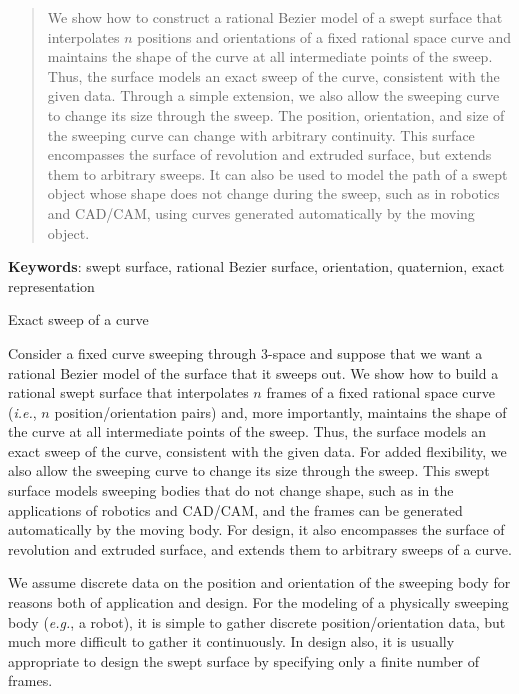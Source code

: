 \maketitle
\thispagestyle{empty}
\begin{abstract}
We show how to construct a rational Bezier model of a swept
surface that interpolates
$n$ positions and orientations of a fixed rational space curve
and maintains the shape of the curve at all intermediate points
of the sweep.
Thus, the surface models
an exact sweep of the curve, consistent with the given data.
Through a simple extension, we also allow the sweeping curve to change
its size through the sweep.
The position, orientation, and size of the sweeping curve can change with
arbitrary continuity.
This surface
encompasses the surface of revolution and extruded surface, but extends
them to arbitrary sweeps.
It can also be used to model the path of a swept object whose shape does not
change during the sweep, such as in robotics and CAD/CAM, using curves generated
automatically by the moving object.
\end{abstract}

{\bf Keywords}: swept surface, rational Bezier surface, orientation, quaternion, exact representation

\clearpage

Exact sweep of a curve

Consider a fixed curve sweeping through 3-space and suppose
that we want a rational Bezier model of the surface that it sweeps out.
We show how to build a rational swept surface that
interpolates $n$ frames of a fixed rational space curve 
({\em i.e.}, $n$ position/orientation pairs) 
and, more importantly, 
maintains the shape of the curve at all intermediate points of the sweep.
Thus, the surface models 
an exact sweep of the curve, consistent with the given data.
For added flexibility, we also allow the sweeping curve to change its
size through the sweep.
This swept surface models sweeping bodies that do not change shape,
such as in the applications of robotics and CAD/CAM,
and the frames can be generated automatically by the moving body.
For design, it also encompasses the surface of revolution 
and extruded surface, and extends them to arbitrary sweeps of a curve.

We assume discrete data on the position and orientation
of the sweeping body for reasons both of application and design.
For the modeling of a physically sweeping body ({\em e.g.}, a robot), 
it is simple to gather discrete position/orientation data, 
but much more difficult to gather it continuously.
In design also, it is usually appropriate to design the swept surface
by specifying only a finite number of frames.

